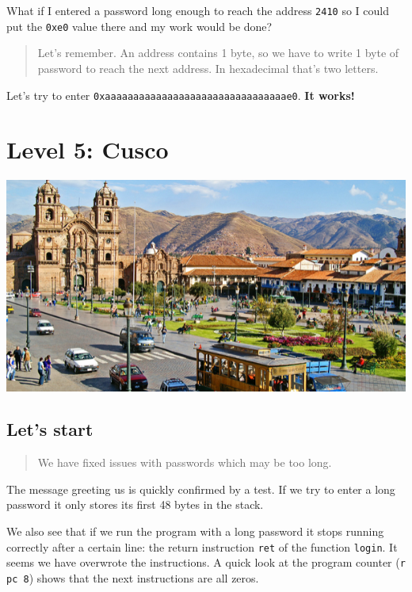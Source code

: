 \documentclass[a4paper,11pt]{article}
\begin{document}
What if I entered a password long enough to reach the address
\texttt{2410} so I could put the \texttt{0xe0} value there and my work
would be done?

\begin{quote}
Let's remember. An address contains 1 byte, so we have to write 1 byte
of password to reach the next address. In hexadecimal that's two
letters.
\end{quote}

Let's try to enter \texttt{0xaaaaaaaaaaaaaaaaaaaaaaaaaaaaaaaae0}.
\textbf{It works!}

\section{Level 5: Cusco}\label{level-5-cusco}

\includegraphics{img/5_1.PNG}

\subsection{Let's start}\label{lets-start}

\begin{quote}
We have fixed issues with passwords which may be too long.
\end{quote}

The message greeting us is quickly confirmed by a test. If we try to
enter a long password it only stores its first 48 bytes in the stack.

We also see that if we run the program with a long password it stops
running correctly after a certain line: the return instruction
\texttt{ret} of the function \texttt{login}. It seems we have overwrote
the instructions. A quick look at the program counter (\texttt{r pc 8})
shows that the next instructions are all zeros.
\end{document}
